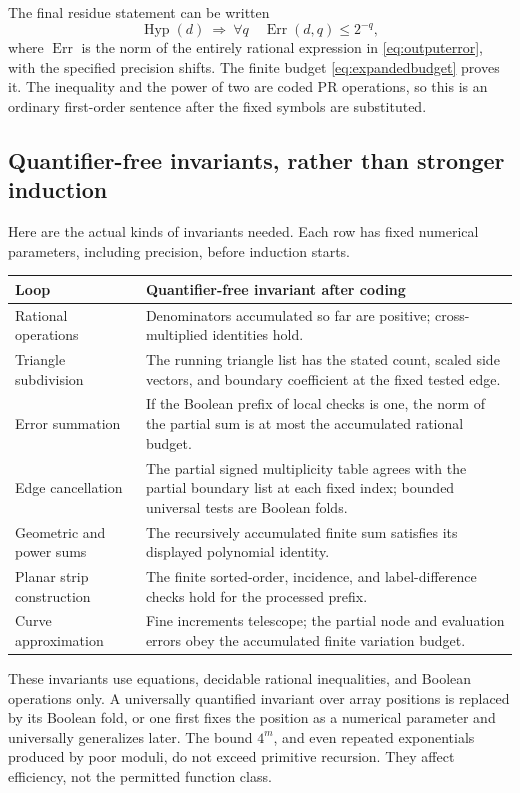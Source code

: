 \documentclass[11pt]{article}
\theoremstyle{definition}
\begin{document}
The final residue statement can be written
\begin{equation}\label{eq:arithconclusion}
 \operatorname{Hyp}(d)\ \Longrightarrow\
 \forall q\quad\operatorname{Err}(d,q)\le2^{-q},
\end{equation}
where \(\operatorname{Err}\) is the norm of the entirely rational
expression in \eqref{eq:outputerror}, with the specified precision
shifts. The finite budget \eqref{eq:expandedbudget} proves it. The
inequality and the power of two are coded PR operations, so this is an
ordinary first-order sentence after the fixed symbols are substituted.

\subsection{Quantifier-free invariants, rather than stronger induction}

Here are the actual kinds of invariants needed. Each row has fixed
numerical parameters, including precision, before induction starts.
\begin{center}
\begin{tabular}{>{\raggedright\arraybackslash}p{}>{\raggedright\arraybackslash}p{}}
\toprule
Loop & Quantifier-free invariant after coding\\\midrule
Rational operations & Denominators accumulated so far are positive;
cross-multiplied identities hold.\\
Triangle subdivision & The running triangle list has the stated count,
scaled side vectors, and boundary coefficient at the fixed tested edge.\\
Error summation & If the Boolean prefix of local checks is one, the
norm of the partial sum is at most the accumulated rational budget.\\
Edge cancellation & The partial signed multiplicity table agrees with
the partial boundary list at each fixed index; bounded universal tests
are Boolean folds.\\
Geometric and power sums & The recursively accumulated finite sum
satisfies its displayed polynomial identity.\\
Planar strip construction & The finite sorted-order, incidence, and
label-difference checks hold for the processed prefix.\\
Curve approximation & Fine increments telescope; the partial node and
evaluation errors obey the accumulated finite variation budget.\\
\bottomrule
\end{tabular}
\end{center}
These invariants use equations, decidable rational inequalities, and
Boolean operations only. A universally quantified invariant over
array positions is replaced by its Boolean fold, or one first fixes the
position as a numerical parameter and universally generalizes later.
The bound \(4^m\), and even repeated exponentials produced by poor
moduli, do not exceed primitive recursion. They affect efficiency, not
the permitted function class.
\end{document}
